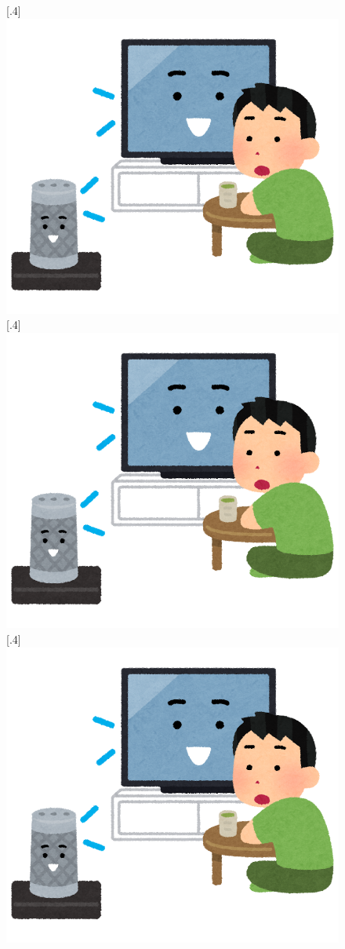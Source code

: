 \begin{figure}[t]
  \centering
  [.4\linewidth]{\includegraphics[width=.8\linewidth]{fig/smart_speaker_tv_talk.png}}
  [.4\linewidth]{\includegraphics[width=.8\linewidth]{fig/smart_speaker_tv_talk.png}}
  [.4\linewidth]{\includegraphics[width=.8\linewidth]{fig/smart_speaker_tv_talk.png}}

\end{figure}
